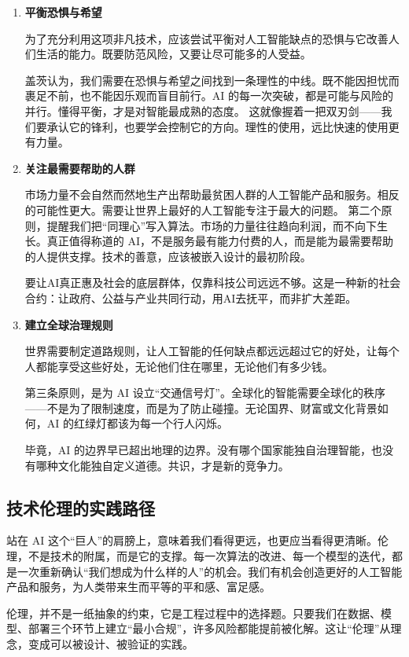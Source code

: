 \begin{enumerate}
\item {\bf 平衡恐惧与希望}

为了充分利用这项非凡技术，应该尝试平衡对人工智能缺点的恐惧与它改善人们生活的能力。既要防范风险，又要让尽可能多的人受益。

盖茨认为，我们需要在恐惧与希望之间找到一条理性的中线。既不能因担忧而裹足不前，也不能因乐观而盲目前行。AI 的每一次突破，都是可能与风险的并行。懂得平衡，才是对智能最成熟的态度。
这就像握着一把双刃剑——我们要承认它的锋利，也要学会控制它的方向。理性的使用，远比快速的使用更有力量。

\item {\bf 关注最需要帮助的人群}

市场力量不会自然而然地生产出帮助最贫困人群的人工智能产品和服务。相反的可能性更大。需要让世界上最好的人工智能专注于最大的问题。
第二个原则，提醒我们把“同理心”写入算法。市场的力量往往趋向利润，而不向下生长。真正值得称道的 AI，不是服务最有能力付费的人，而是能为最需要帮助的人提供支撑。技术的善意，应该被嵌入设计的最初阶段。

要让AI真正惠及社会的底层群体，仅靠科技公司远远不够。这是一种新的社会合约：让政府、公益与产业共同行动，用AI去抚平，而非扩大差距。

\item {\bf 建立全球治理规则}

世界需要制定道路规则，让人工智能的任何缺点都远远超过它的好处，让每个人都能享受这些好处，无论他们住在哪里，无论他们有多少钱。

第三条原则，是为 AI 设立“交通信号灯”。全球化的智能需要全球化的秩序——不是为了限制速度，而是为了防止碰撞。无论国界、财富或文化背景如何，AI 的红绿灯都该为每一个行人闪烁。

毕竟，AI 的边界早已超出地理的边界。没有哪个国家能独自治理智能，也没有哪种文化能独自定义道德。共识，才是新的竞争力。
\end{enumerate}

\subsection{技术伦理的实践路径}

站在 AI 这个“巨人”的肩膀上，意味着我们看得更远，也更应当看得更清晰。伦理，不是技术的附属，而是它的支撑。每一次算法的改进、每一个模型的迭代，都是一次重新确认“我们想成为什么样的人”的机会。我们有机会创造更好的人工智能产品和服务，为人类带来生而平等的平和感、富足感。

伦理，并不是一纸抽象的约束，它是工程过程中的选择题。只要我们在数据、模型、部署三个环节上建立“最小合规”，许多风险都能提前被化解。这让“伦理”从理念，变成可以被设计、被验证的实践。

